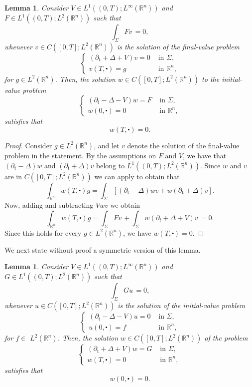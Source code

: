 \documentclass[10pt,a4paper]{amsart}
\newtheorem{lemma}[proposition]{Lemma}
\newcommand{\R}{\mathbb{R}}
\newcommand{\tm}{\mathrm{t}}
\begin{document}
\begin{lemma}\label{Zero Trace 1}\sl Consider $V \in L^1 ((0, T) ; L^\infty (\mathbb{R}^{n}))$ and $F \in L^{1}((0, T) ; L^{2}(\mathbb{R}^{n}))$ such that
$$
\int_{\Sigma} Fv \,=0,
$$
whenever $v \in C([0, T] ; L^{2}(\mathbb{R}^{n}))$ is the solution of the final-value problem
$$
\begin{cases} (\partial_{\tm}+\Delta+V)v=0 & \text { in } \Sigma, \\ v(T, \centerdot)=g & \text { in } \mathbb{R}^{n},\end{cases}
$$
for $g \in L^{2}(\mathbb{R}^{n})$. Then, the solution $w \in C([0, T] ; L^{2}(\mathbb{R}^{n}))$ to the initial-value problem 
$$
\begin{cases} (\partial_{\tm}-\Delta-V)w=F & \text { in } \Sigma, \\ w(0, \centerdot)=0 & \text { in } \mathbb{R}^{n},\end{cases}
$$
satisfies that
$$
w(T, \centerdot)=0.
$$
\end{lemma}
\begin{proof}
Consider $g \in L^{2}(\mathbb{R}^{n})$, and let $v$ denote the solution of the final-value 
problem in the statement. By the assumptions on $F$ and $V$, we have that
$(\partial_\tm - \Delta)w$ and $(\partial_\tm + \Delta)v$ belong to $L^1((0,T); L^2(\R^n))$.
Since $w$ and $v$ are in $C([0, T] ; L^{2}(\mathbb{R}^{n}))$ we can apply  to
obtain that
$$
 \int_{\mathbb{R}^{n}} w(T, \centerdot) g=\int_{\Sigma}\left[( \partial_{\tm}-\Delta)wv+w( \partial_{\tm}+\Delta) v\right].
$$
Now, adding and subtracting $V wv $ we obtain
$$
\int_{\mathbb{R}^{n}} w(T, \centerdot) g=\int_{\Sigma} F v \, + \int_{\Sigma} w ( \partial_{t}+\Delta+V) v\, =0.
$$
Since this holds for every $ g \in L^{2}(\mathbb{R}^{n})$, we have $w(T, \centerdot)=0$.
\end{proof}

We next state without proof a symmetric version of this lemma.

\begin{lemma}\label{Zero Trace 2}\sl Consider $V \in L^{1}((0, T) ; L^{\infty}(\mathbb{R}^{n}))$ and $G \in L^{1}((0, T) ; L^{2}(\mathbb{R}^{n}))$ such that
$$
\int_{\Sigma} G u\, =0,
$$
whenever $u \in C([0, T] ; L^{2}(\mathbb{R}^{n}))$ is the solution of the initial-value problem
$$
\begin{cases} (\partial_{\tm}-\Delta-V)u=0 & \text { in } \Sigma, \\ u(0, \centerdot)=f & \text { in } \mathbb{R}^{n},\end{cases}
$$
for $f \in$ $L^{2}(\mathbb{R}^{n})$. Then, the solution $w \in C([0, T] ; L^{2}(\mathbb{R}^{n}))$ of the problem
$$
\begin{cases}(\partial_{\tm}+\Delta+V) w=G & \text { in } \Sigma,  \\ w(T, \centerdot)=0 & \text { in } \mathbb{R}^{n},\end{cases}
$$
satisfies that
$$
w(0, \centerdot)=0.
$$
\end{lemma}
\end{document}
